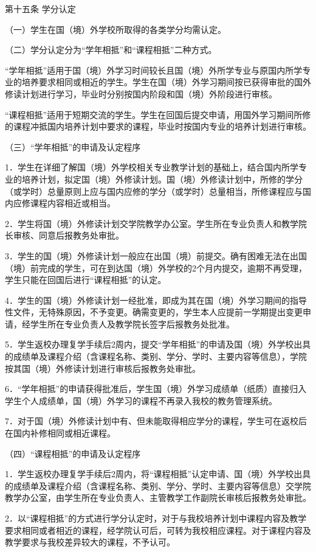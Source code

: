 \documentclass[UTF8,12pt,a4paper]{report}
\begin{document}
第十五条 学分认定

（一）学生在国（境）外学校所取得的各类学分均需认定。

（二）学分认定分为“学年相抵”和“课程相抵”二种方式。

“学年相抵”适用于国（境）外学习时间较长且国（境）外所学专业与原国内所学专业的培养要求相同或相近的学生。学生在国（境）外学习期间按已获得审批的国外修读计划进行学习，毕业时分别按国内阶段和国（境）外阶段进行审核。

“课程相抵”适用于短期交流的学生。学生在回国后提交申请，用国外学习期间所修的课程冲抵国内培养计划中要求的课程，毕业时按国内专业的培养计划进行审核。

（三）“学年相抵”的申请及认定程序

1．学生在详细了解国（境）外学校相关专业教学计划的基础上，结合国内所学专业的培养计划，拟定国（境）外修读计划。国（境）外修读计划中，所修的学分（或学时）总量原则上应与国内应修的学分（或学时）总量相当，所修课程应与国内应修课程内容相近或相当。

2．学生将国（境）外修读计划交学院教学办公室。学生所在专业负责人和教学院长审核、同意后报教务处审批。

3．学生的国（境）外修读计划一般应在出国（境）前提交。确有困难无法在出国（境）前完成的学生，可在到达国（境）外学校的2个月内提交，逾期不再受理，学生只能在回国后进行“课程相抵”的认定。

4．学生的国（境）外修读计划一经批准，即成为其在国（境）外学习期间的指导性文件，无特殊原因，不予变更。确需变更的，学生本人应提前一学期提出变更申请，经学生所在专业负责人及教学院长签字后报教务处批准。

5．学生返校办理复学手续后2周内，提交“学年相抵”的申请及国（境）外学校出具的成绩单及课程介绍（含课程名称、类别、学分、学时、主要内容等信息），学院按其国（境）外修读计划进行审核后报教务处审批。

6．“学年相抵”的申请获得批准后，学生国（境）外学习成绩单（纸质）直接归入学生个人成绩单，国（境）外学习的课程不再录入我校的教务管理系统。

7．对于国（境）外修读计划中有、但未能取得相应学分的课程，学生可在返校后在国内补修相同或相近课程。

（四）“课程相抵”的申请及认定程序

1．学生返校办理复学手续后2周内，将“课程相抵”认定申请、国（境）外学校出具的成绩单及课程介绍（含课程名称、类别、学分、学时、主要内容等信息）交学院教学办公室，由学生所在专业负责人、主管教学工作副院长审核后报教务处审批。

2．以“课程相抵”的方式进行学分认定时，对于与我校培养计划中课程内容及教学要求相同或者相近的课程，经学院认可后，可转为我校相应课程。对于课程内容及教学要求与我校差异较大的课程，不予认可。
\end{document}

